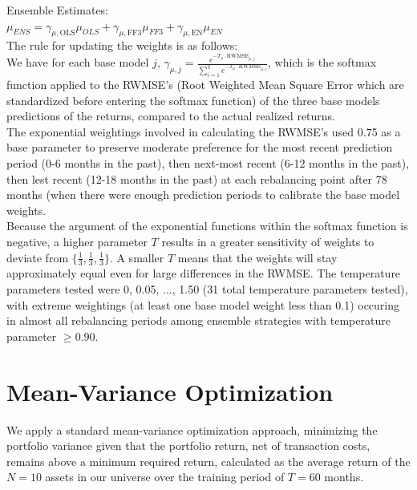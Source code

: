 \documentclass{article}
\begin{document}
Ensemble Estimates:\\

$\mu_{ENS} = \gamma_{\mu, \text{OLS}} \mu_{OLS} + \gamma_{\mu, \text{FF3}} \mu_{FF3} + \gamma_{\mu, \text{EN}} \mu_{EN}$\\

The rule for updating the weights is as follows:\\

We have for each base model $j$, $\gamma_{\mu, j} = \frac{e^{-T_{\mu} \cdot \text{RWMSE}_{\mu,j}}}{\sum_{i=1}^3 e^{-T_{\mu} \cdot \text{RWMSE}_{\mu,i}}}$, which is the softmax function applied to the RWMSE's (Root Weighted Mean Square Error which are standardized before entering the softmax function) of the three base models predictions of the returns, compared to the actual realized returns.\\

The exponential weightings involved in calculating the RWMSE's used 0.75 as a base parameter to preserve moderate preference for the most recent prediction period (0-6 months in the past), then next-most recent (6-12 months in the past), then lest recent (12-18 months in the past) at each rebalancing point after 78 months (when there were enough prediction periods to calibrate the base model weights.\\

Because the argument of the exponential functions within the softmax function is negative, a higher parameter $T$ results in a greater sensitivity of weights to deviate from $\{\frac{1}{3}, \frac{1}{3}, \frac{1}{3}\}$. A smaller $T$ means that the weights will stay approximately equal even for large differences in the RWMSE. The temperature parameters tested were 0, 0.05, ..., 1.50 (31 total temperature parameters tested), with extreme weightings (at least one base model weight less than 0.1) occuring in almost all rebalancing periods among ensemble strategies with temperature parameter $\geq 0.90$.\\

\break

\section{Mean-Variance Optimization}

We apply a standard mean-variance optimization approach, minimizing the portfolio variance given that the portfolio return, net of transaction costs, remains above a minimum required return, calculated as the average return of the $N=10$ assets in our universe over the training period of $T=60$ months.\\
\end{document}
